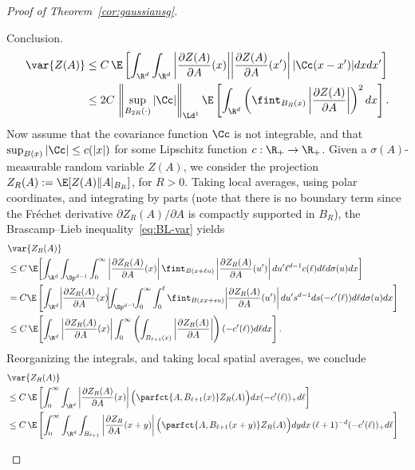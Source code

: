 \begin{proof}[Proof of Theorem~\ref{cor:gaussiansg}]
\begin{step}{Conclusion.}
\begin{align*}
\var{Z(A)}&\le C\,\E\left[\int_{\R^d}\int_{\R^d} \left|\frac{\partial Z(A)}{\partial A}(x)\bigg|\bigg|\frac{\partial Z(A)}{\partial A}(x')\right||\Cc(x-x')|dxdx'\right]
\\
&\le2C\,\left\|\sup_{B_{2R}(\cdot)}|\Cc|\right\|_{\Ld^1}\E\left[\int_{\R^d} \left(\fint_{B_R(x)}\left|\frac{\partial Z(A)}{\partial A}\right|\right)^2dx\right].
\end{align*}
Now assume that the covariance function $\Cc$ is not integrable, and that $\sup_{B(x)}\linebreak|\Cc|\le c(|x|)$ for some Lipschitz function $c:\R_+\to\R_+$. Given a $\sigma(A)$-measurable random variable $Z(A)$, we consider the projection $Z_R(A):=\E[Z(A)\| A|_{B_R}]$, for $R>0$. Taking local averages, using polar coordinates, and integrating by parts (note that there is no boundary term since the Fréchet derivative $\partial Z_R(A)/\partial A$ is compactly supported in $B_R$), the Brascamp--Lieb inequality~\eqref{eq:BL-var} yields
{\small
\begin{align*}
\lefteqn{\var{Z_R(A)}}
\\
&\le C\,\E\!\left[\int_{\R^d}\int_{\Sp^{d-1}}\int_0^\infty
\left|\frac{\partial Z_R(A)}{\partial A}(x) \right|\fint_{B(x+\ell u)}\left|\frac{\partial Z_R(A)}{\partial A}(u')\right|du' \ell^{d-1}c(\ell)d\ell d\sigma(u)dx\right]\\
&=C\E\left[\int_{\R^d}\!\left|\frac{\partial Z_R(A)}{\partial A}(x)\!\right|\!\!\int_{\Sp^{d-1}}\!\!\int_0^\infty\int_0^\ell
\fint_{B(xx+s u)}\!\left|\frac{\partial Z_R(A)}{\partial A}(u')\right|du' s^{d-1}ds(-c'(\ell))d\ell d\sigma(u)dx\right]\\
&\le C\,\E\!\left[\int_{\R^d} \left|\frac{\partial Z_R(A)}{\partial A}(x) \right|\int_0^\infty\left(\int_{B_{\ell+1}(x)}\left|\frac{\partial Z_R(A)}{\partial A}\right|\right)(-c'(\ell))d\ell dx\right].
\end{align*}
}
Reorganizing the integrals, and taking local spatial averages, we conclude
\begin{align*}
\lefteqn{\var{Z_R(A)}}
\\
&\le C\,\E\left[\int_0^\infty \int_{\R^d} \left|\frac{\partial Z_R(A)}{\partial A}(x) \right|\Big(\parfct{A,B_{\ell+1}(x)}Z_R(A)\Big) dx(-c'(\ell))_+d\ell\right]\\
&\le C\,\E\left[\int_0^\infty \int_{\R^d}\int_{B_{\ell+1}}\left|\frac{\partial Z_R}{\partial A}(x+y)\right|\Big(\parfct{A,B_{\ell+1}(x+y)}Z_R(A)\Big)dydx\,(\ell+1)^{-d}(-c'(\ell))_+d\ell\right]\\

\end{align*}
\end{step}
\end{proof}
